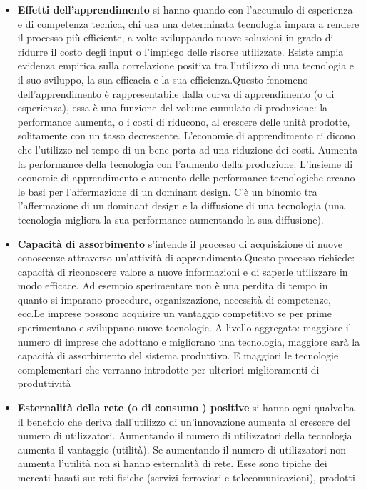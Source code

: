 \documentclass{article}
\begin{document}
\begin{enumerate}
	\begin{itemize}
		\item \textbf{Effetti dell'apprendimento}  si hanno quando con l’accumulo di esperienza e di competenza
		tecnica, chi usa una determinata tecnologia impara a rendere il processo più efficiente, a
		volte sviluppando nuove soluzioni in grado di ridurre il costo degli input o l’impiego delle
		risorse utilizzate. 
		Esiste ampia evidenza empirica sulla correlazione positiva tra l’utilizzo di una tecnologia e il suo sviluppo, la sua efficacia e la sua efficienza.Questo fenomeno dell’apprendimento è rappresentabile dalla curva di apprendimento (o di esperienza), essa è una funzione del volume cumulato di produzione:
		la performance aumenta, o i costi di riducono, al crescere delle unità prodotte, solitamente
		con un tasso decrescente.
		L’economie di apprendimento ci dicono che l’utilizzo nel tempo di un bene porta ad una
		riduzione dei costi. Aumenta la performance della tecnologia con l’aumento della
		produzione.
		L’insieme di economie di apprendimento e aumento delle performance tecnologiche
		creano le basi per l’affermazione di un dominant design.
		C’è un binomio tra l’affermazione di un dominant design e la diffusione di una tecnologia
		(una tecnologia migliora la sua performance aumentando la sua diffusione).
		\item \textbf {Capacità di assorbimento} s’intende il processo di acquisizione di nuove conoscenze attraverso un’attività di apprendimento.Questo processo richiede: capacità di riconoscere valore a nuove informazioni e di saperle utilizzare in modo efficace. Ad esempio sperimentare non è una perdita di tempo in quanto si imparano procedure, organizzazione, necessità di competenze, ecc.Le imprese possono acquisire un vantaggio competitivo se per prime sperimentano e sviluppano nuove tecnologie. A livello aggregato: maggiore il numero di imprese che adottano e migliorano una tecnologia, maggiore sarà la capacità di assorbimento del sistema produttivo. E maggiori le tecnologie complementari che verranno introdotte per ulteriori miglioramenti di produttività
		\item \textbf{Esternalità della rete (o di consumo ) positive } si hanno ogni qualvolta il beneficio che deriva
		dall’utilizzo di un’innovazione aumenta al crescere del numero di utilizzatori. Aumentando
		il numero di utilizzatori della tecnologia aumenta il vantaggio (utilità). Se aumentando il
		numero di utilizzatori non aumenta l’utilità non si hanno esternalità di rete. Esse sono
		tipiche dei mercati basati su: reti fisiche (servizi ferroviari e telecomunicazioni), prodotti

\end{itemize}
\end{enumerate}
\end{document}
